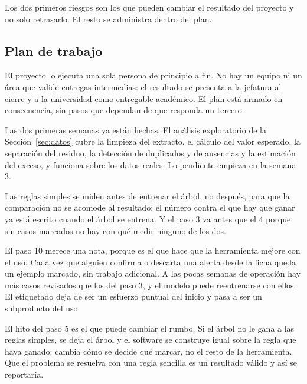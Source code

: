 Los dos primeros riesgos son los que pueden cambiar el resultado del proyecto y no solo retrasarlo. El resto se administra dentro del plan.

\fi
\iffinal\else
\subsection{Plan de trabajo}
\label{sec:plan}

El proyecto lo ejecuta una sola persona de principio a fin. No hay un equipo ni un área que valide entregas intermedias: el resultado se presenta a la jefatura al cierre y a la universidad como entregable académico. El plan está armado en consecuencia, sin pasos que dependan de que responda un tercero.

Las dos primeras semanas ya están hechas. El análisis exploratorio de la Sección~\ref{sec:datos} cubre la limpieza del extracto, el cálculo del valor esperado, la separación del residuo, la detección de duplicados y de ausencias y la estimación del exceso, y funciona sobre los datos reales. Lo pendiente empieza en la semana 3.

 Las reglas simples se miden antes de entrenar el árbol, no después, para que la comparación no se acomode al resultado: el número contra el que hay que ganar ya está escrito cuando el árbol se entrena. Y el paso 3 va antes que el 4 porque sin casos marcados no hay con qué medir ninguno de los dos.

El paso 10 merece una nota, porque es el que hace que la herramienta mejore con el uso. Cada vez que alguien confirma o descarta una alerta desde la ficha queda un ejemplo marcado, sin trabajo adicional. A las pocas semanas de operación hay más casos revisados que los del paso 3, y el modelo puede reentrenarse con ellos. El etiquetado deja de ser un esfuerzo puntual del inicio y pasa a ser un subproducto del uso.

El hito del paso 5 es el que puede cambiar el rumbo. Si el árbol no le gana a las reglas simples, se deja el árbol y el software se construye igual sobre la regla que haya ganado: cambia cómo se decide qué marcar, no el resto de la herramienta. Que el problema se resuelva con una regla sencilla es un resultado válido y así se reportaría.

